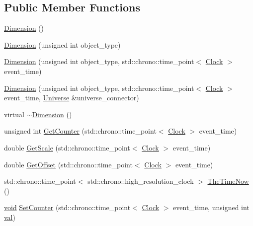 \subsection*{Public Member Functions}
\begin{DoxyCompactItemize}
\item 
\mbox{\hyperlink{class_dimension_aa61dad15f33b6c3d09028ba9e545aa70}{Dimension}} ()
\item 
\mbox{\hyperlink{class_dimension_a68def81e037c1bcc005591f45c53e3a3}{Dimension}} (unsigned int object\+\_\+type)
\item 
\mbox{\hyperlink{class_dimension_ab48cbe6ca22404ab5a2c522498c38d7c}{Dimension}} (unsigned int object\+\_\+type, std\+::chrono\+::time\+\_\+point$<$ \mbox{\hyperlink{universe_8h_a0ef8d951d1ca5ab3cfaf7ab4c7a6fd80}{Clock}} $>$ event\+\_\+time)
\item 
\mbox{\hyperlink{class_dimension_a9282c4669e8f97dce010324886d79a99}{Dimension}} (unsigned int object\+\_\+type, std\+::chrono\+::time\+\_\+point$<$ \mbox{\hyperlink{universe_8h_a0ef8d951d1ca5ab3cfaf7ab4c7a6fd80}{Clock}} $>$ event\+\_\+time, \mbox{\hyperlink{class_universe}{Universe}} \&universe\+\_\+connector)
\item 
virtual \mbox{\hyperlink{class_dimension_aa990dfd442020c193a1941e9dffbfbee}{$\sim$\+Dimension}} ()
\item 
unsigned int \mbox{\hyperlink{class_dimension_a2fbee64eeea5de3d8eab10cf0fdb6363}{Get\+Counter}} (std\+::chrono\+::time\+\_\+point$<$ \mbox{\hyperlink{universe_8h_a0ef8d951d1ca5ab3cfaf7ab4c7a6fd80}{Clock}} $>$ event\+\_\+time)
\item 
double \mbox{\hyperlink{class_dimension_a6985e3d8738202530cb2cd428b5b884c}{Get\+Scale}} (std\+::chrono\+::time\+\_\+point$<$ \mbox{\hyperlink{universe_8h_a0ef8d951d1ca5ab3cfaf7ab4c7a6fd80}{Clock}} $>$ event\+\_\+time)
\item 
double \mbox{\hyperlink{class_dimension_a58009cd435ead4b7b2f395a11fda0ae8}{Get\+Offset}} (std\+::chrono\+::time\+\_\+point$<$ \mbox{\hyperlink{universe_8h_a0ef8d951d1ca5ab3cfaf7ab4c7a6fd80}{Clock}} $>$ event\+\_\+time)
\item 
std\+::chrono\+::time\+\_\+point$<$ std\+::chrono\+::high\+\_\+resolution\+\_\+clock $>$ \mbox{\hyperlink{class_dimension_ab39b7ff253ade59c5c2d807c511b4028}{The\+Time\+Now}} ()
\item 
\mbox{\hyperlink{glad_8h_a950fc91edb4504f62f1c577bf4727c29}{void}} \mbox{\hyperlink{class_dimension_a75c6a1a1e09c40b5860dc11a83384d9f}{Set\+Counter}} (std\+::chrono\+::time\+\_\+point$<$ \mbox{\hyperlink{universe_8h_a0ef8d951d1ca5ab3cfaf7ab4c7a6fd80}{Clock}} $>$ event\+\_\+time, unsigned int \mbox{\hyperlink{glad_8h_a26942fd2ed566ef553eae82d2c109c8f}{val}})

\end{DoxyCompactItemize}
